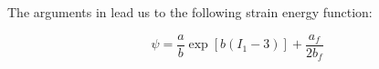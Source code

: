

The arguments in \citep{Holzapfel:2009bb} lead us to the following
strain energy function:

\begin{equation}
  \psi = \frac{a}{b}\exp[b(I_{1} - 3)] + \frac{a_f}{2 b_f}
\end{equation}



%

